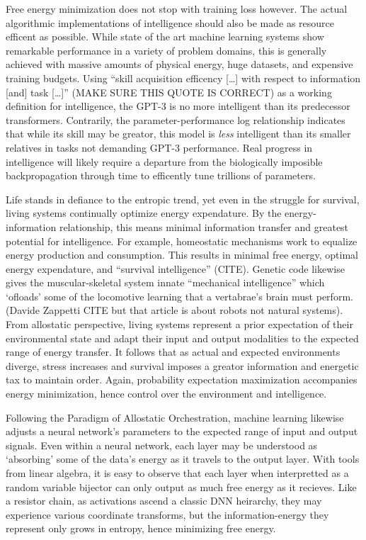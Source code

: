 Free energy minimization does not stop with training loss however. The actual algorithmic implementations of intelligence should also be made as resource efficent as possible. While state of the art machine learning systems show remarkable performance in a variety of problem domains, this is generally achieved with massive amounts of physical energy, huge datasets, and expensive training budgets. Using ``skill acquisition efficency [\dots] with respect to information [and] task [\dots]'' (MAKE SURE THIS QUOTE IS CORRECT) as a working definition for intelligence, the GPT-3 is no more intelligent than its predecessor transformers. Contrarily, the parameter-performance log relationship \citep[11]{Brown2020} indicates that while its skill may be greator, this model is \textit{less} intelligent than its smaller relatives in tasks not demanding GPT-3 performance. Real progress in intelligence will likely require a departure from the biologically imposible backpropagation through time to efficently tune trillions of parameters.

Life stands in defiance to the entropic trend, yet even in the struggle for survival, living systems continually optimize energy expendature. By the energy-information relationship, this means minimal information transfer and greatest potential for intelligence. For example, homeostatic mechanisms work to equalize energy production and consumption. This results in minimal free energy, optimal energy expendature, and ``survival intelligence'' (CITE). Genetic code likewise gives the muscular-skeletal system innate ``mechanical intelligence'' which `ofloads' some of the locomotive learning that a vertabrae's brain must perform. (Davide Zappetti CITE but that article is about robots not natural systems). From allostatic perspective, living systems represent a prior expectation of their environmental state and adapt their input and output modalities to the expected range of energy transfer. It follows that as actual and expected environments diverge, stress increases and survival imposes a greator information and energetic tax to maintain order. Again, probability expectation maximization accompanies energy minimization, hence control over the environment and intelligence.

Following the Paradigm of Allostatic Orchestration, machine learning likewise adjusts a neural network's parameters to the expected range of input and output signals. Even within a neural network, each layer may be understood as `absorbing' some of the data's energy as it travels to the output layer. With tools from linear algebra, it is easy to observe that each layer when interpretted as a random variable bijector can only output as much free energy as it recieves. Like a resistor chain, as activations ascend a classic DNN heirarchy, they may experience various coordinate transforms, but the information-energy they represent only grows in entropy, hence minimizing free energy.

